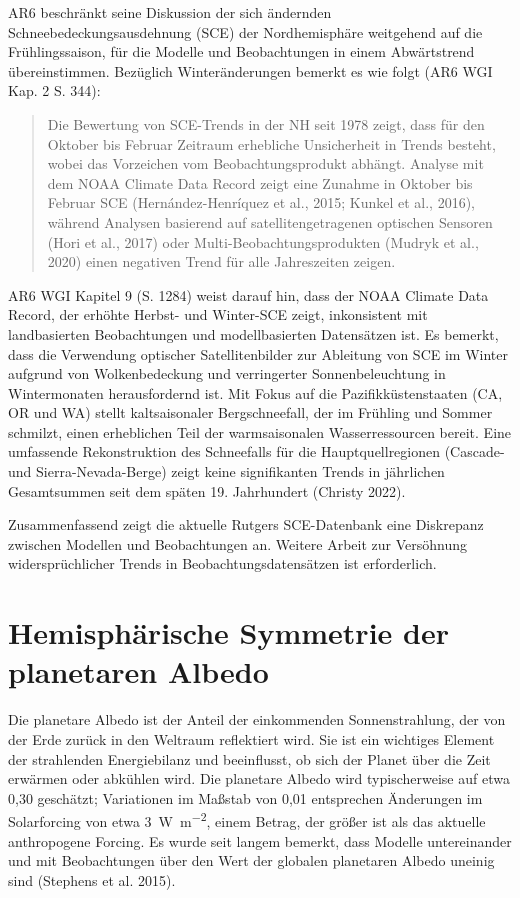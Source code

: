 \documentclass[12pt,paper=a4,DIV=12,parskip=never,chapterprefix=false,headings=standardclasses]{scrreprt}
\begin{document}
AR6 beschränkt seine Diskussion der sich ändernden Schneebedeckungsausdehnung (SCE) der Nordhemisphäre weitgehend auf die Frühlingssaison, für die Modelle und Beobachtungen in einem Abwärtstrend übereinstimmen. Bezüglich Winteränderungen bemerkt es wie folgt (AR6 WGI Kap. 2 S. 344):
\begin{quote}
Die Bewertung von SCE-Trends in der NH seit 1978 zeigt, dass für den Oktober bis Februar Zeitraum erhebliche Unsicherheit in Trends besteht, wobei das Vorzeichen vom Beobachtungsprodukt abhängt. Analyse mit dem NOAA Climate Data Record zeigt eine Zunahme in Oktober bis Februar SCE (Hernández-Henríquez et al., 2015; Kunkel et al., 2016), während Analysen basierend auf satellitengetragenen optischen Sensoren (Hori et al., 2017) oder Multi-Beobachtungsprodukten (Mudryk et al., 2020) einen negativen Trend für alle Jahreszeiten zeigen.
\end{quote}

AR6 WGI Kapitel 9 (S. 1284) weist darauf hin, dass der NOAA Climate Data Record, der erhöhte Herbst- und Winter-SCE zeigt, inkonsistent mit landbasierten Beobachtungen und modellbasierten Datensätzen ist. Es bemerkt, dass die Verwendung optischer Satellitenbilder zur Ableitung von SCE im Winter aufgrund von Wolkenbedeckung und verringerter Sonnenbeleuchtung in Wintermonaten herausfordernd ist. Mit Fokus auf die Pazifikküstenstaaten (CA, OR und WA) stellt kaltsaisonaler Bergschneefall, der im Frühling und Sommer schmilzt, einen erheblichen Teil der warmsaisonalen Wasserressourcen bereit.
Eine umfassende Rekonstruktion des Schneefalls für die Hauptquellregionen (Cascade- und Sierra-Nevada-Berge) zeigt keine signifikanten Trends in jährlichen Gesamtsummen seit dem späten 19. Jahrhundert (Christy 2022).

Zusammenfassend zeigt die aktuelle Rutgers SCE-Datenbank eine Diskrepanz zwischen Modellen und Beobachtungen an. Weitere Arbeit zur Versöhnung widersprüchlicher Trends in Beobachtungsdatensätzen ist erforderlich.

\section{Hemisphärische Symmetrie der planetaren Albedo}
Die planetare Albedo ist der Anteil der einkommenden Sonnenstrahlung, der von der Erde zurück in den Weltraum reflektiert wird. Sie ist ein wichtiges Element der strahlenden Energiebilanz und beeinflusst, ob sich der Planet über die Zeit erwärmen oder abkühlen wird. Die planetare Albedo wird typischerweise auf etwa 0,30 geschätzt; Variationen im Maßstab von 0,01 entsprechen Änderungen im Solarforcing von etwa \SI{3}{\watt\per\square\meter}, einem Betrag, der größer ist als das aktuelle anthropogene Forcing. Es wurde seit langem bemerkt, dass Modelle untereinander und mit Beobachtungen über den Wert der globalen planetaren Albedo uneinig sind (Stephens et al. 2015).
\end{document}
